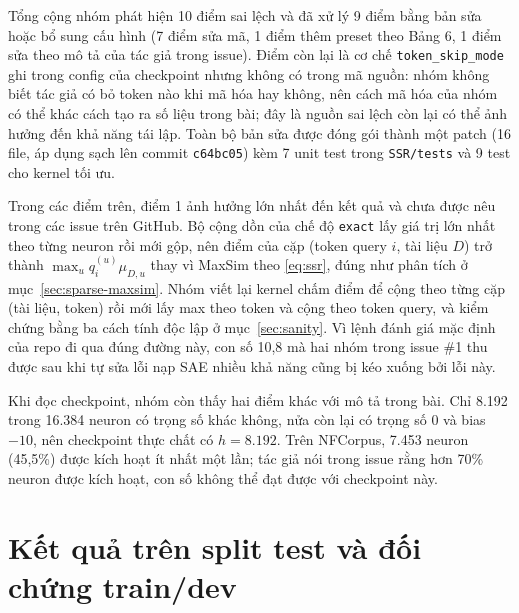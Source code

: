 \documentclass[a4paper,13pt]{extreport}
\theoremstyle{plain}
\begin{document}
Tổng cộng nhóm phát hiện 10 điểm sai lệch và đã xử lý 9 điểm bằng bản sửa hoặc bổ sung cấu hình (7 điểm sửa mã, 1 điểm thêm preset theo Bảng 6, 1 điểm sửa theo mô tả của tác giả trong issue). Điểm còn lại là cơ chế \texttt{token\_skip\_mode} ghi trong config của checkpoint nhưng không có trong mã nguồn: nhóm không biết tác giả có bỏ token nào khi mã hóa hay không, nên cách mã hóa của nhóm có thể khác cách tạo ra số liệu trong bài; đây là nguồn sai lệch còn lại có thể ảnh hưởng đến khả năng tái lập. Toàn bộ bản sửa được đóng gói thành một patch (16 file, áp dụng sạch lên commit \texttt{c64bc05}) kèm 7 unit test trong \texttt{SSR/tests} và 9 test cho kernel tối ưu.

Trong các điểm trên, điểm 1 ảnh hưởng lớn nhất đến kết quả và chưa được nêu trong các issue trên GitHub. Bộ cộng dồn của chế độ \texttt{exact} lấy giá trị lớn nhất theo từng neuron rồi mới gộp, nên điểm của cặp (token query $i$, tài liệu $D$) trở thành $\max_u q_i^{(u)}\mu_{D,u}$ thay vì MaxSim theo \eqref{eq:ssr}, đúng như phân tích ở mục~\ref{sec:sparse-maxsim}. Nhóm viết lại kernel chấm điểm để cộng theo từng cặp (tài liệu, token) rồi mới lấy max theo token và cộng theo token query, và kiểm chứng bằng ba cách tính độc lập ở mục~\ref{sec:sanity}. Vì lệnh đánh giá mặc định của repo đi qua đúng đường này, con số 10,8 mà hai nhóm trong issue \#1 thu được sau khi tự sửa lỗi nạp SAE nhiều khả năng cũng bị kéo xuống bởi lỗi này.

Khi đọc checkpoint, nhóm còn thấy hai điểm khác với mô tả trong bài. Chỉ 8.192 trong 16.384 neuron có trọng số khác không, nửa còn lại có trọng số 0 và bias $-10$, nên checkpoint thực chất có $h=8.192$. Trên NFCorpus, 7.453 neuron (45,5\%) được kích hoạt ít nhất một lần; tác giả nói trong issue rằng hơn 70\% neuron được kích hoạt, con số không thể đạt được với checkpoint này.

\section{Kết quả trên split test và đối chứng train/dev}
\end{document}
